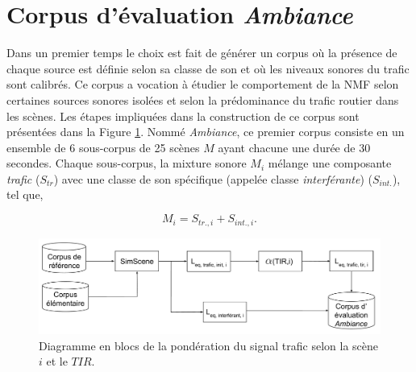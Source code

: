 \section{Corpus d'évaluation \textit{Ambiance}}
\label{part:corpus_ambiance}
Dans un premier temps le choix est fait de générer un corpus où la présence de chaque source est définie selon sa classe de son et où les niveaux sonores du trafic sont calibrés. Ce corpus a vocation à étudier le comportement de la NMF selon certaines sources sonores isolées et selon la prédominance du trafic routier dans les scènes. Les étapes impliquées dans la construction de ce corpus sont présentées dans la Figure \ref{fig:bloc_diagram_tir}. Nommé \textit{Ambiance}, ce premier corpus consiste en un ensemble de 6 sous-corpus de 25 scènes $M$ ayant chacune une durée de 30 secondes. Chaque sous-corpus, la mixture sonore $M_i$ mélange une composante \textit{trafic} ($S_{tr}$) avec une classe de son spécifique (appelée classe \textit{interférante}) ($S_{int.}$), tel que,  

\begin{equation}
M_i = S_{tr.,i}+S_{int.,i}.
\end{equation}

\begin{figure}[ht]
\centering
\includegraphics[width=.9\linewidth]{./figures/autres/TIR_ambiance.pdf}
\caption{Diagramme en blocs de la pondération du signal trafic selon la scène $i$ et le $TIR$.}
\label{fig:bloc_diagram_tir}
\end{figure}


